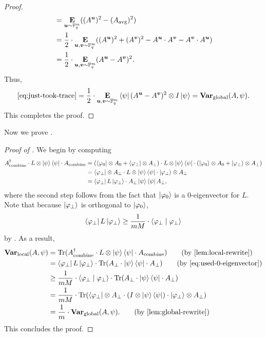 \begin{proof}
\begin{align*}
&= \mathop{\bf E\/}_{\boldsymbol{u} \sim \mathbb F_q^m}((A^{\boldsymbol{u}})^2 - (A_{\mathrm{avg}})^2)\\
&= \frac{1}{2}\cdot\mathop{\bf E\/}_{\boldsymbol{u}, \boldsymbol{v} \sim \mathbb F_q^m}((A^{\boldsymbol{u}})^2 + (A^{\boldsymbol{v}})^2 - A^{\boldsymbol{u}} \cdot A^{\boldsymbol{v}} - A^{\boldsymbol{v}} \cdot A^{\boldsymbol{u}})\\
&= \frac{1}{2}\cdot\mathop{\bf E\/}_{\boldsymbol{u}, \boldsymbol{v} \sim \mathbb F_q^m}(A^{\boldsymbol{u}} - A^{\boldsymbol{v}})^2.
\end{align*}
Thus,
\begin{equation*}
\eqref{eq:just-took-trace}
= \frac{1}{2} \cdot\mathop{\bf E\/}_{\boldsymbol{u}, \boldsymbol{v} \sim \mathbb F_q^m} \bra{\psi} (A^{\boldsymbol{u}} - A^{\boldsymbol{v}})^2 \otimes I \ket{\psi}
= \mathbf{Var}_{\mathrm{global}}(A, \psi).
\end{equation*}
This completes the proof.
\end{proof}

Now we prove .

\begin{proof}[Proof of ]
We begin by computing
\begin{align}
A_{\mathrm{combine}}^\dagger \cdot L \otimes \ket{\psi}\bra{\psi} \cdot A_{\mathrm{combine}}
 &=(\bra{\varphi_0} \otimes A_0 + \bra{\varphi_{\perp}} \otimes A_{\perp}) \cdot L \otimes \ket{\psi}\bra{\psi} \cdot (\ket{\varphi_0} \otimes A_0 + \ket{\varphi_{\perp}} \otimes A_{\perp})\nonumber\\
  &=\bra{\varphi_{\perp}} \otimes A_{\perp} \cdot L \otimes \ket{\psi}\bra{\psi} \cdot \ket{\varphi_{\perp}} \otimes A_{\perp} \nonumber\\
  & = \bra{\varphi_{\perp}} L \ket{\varphi_{\perp}} \cdot A_{\perp}  \ket{\psi}\bra{\psi}  A_{\perp} ,\label{eq:used-0-eigenvector}
\end{align}
where the second step follows from the fact that $\ket{\varphi_{0}}$ is a $0$-eigenvector for $L$.
Note that because $\ket{\varphi_{\perp}}$ is orthogonal to $\ket{\varphi_0}$,
\begin{equation*}
\bra{\varphi_{\perp}} L \ket{\varphi_{\perp}} \geq \frac{1}{mM} \cdot \braket{\varphi_{\perp} \mid \varphi_{\perp}}
\end{equation*}
by .
As a result,
\begin{align*}
 \mathbf{Var}_{\mathrm{local}}(A,\psi) 
 & = \mathrm{Tr}(A_{\mathrm{combine}}^\dagger \cdot L \otimes \ket{\psi}\bra{\psi} \cdot A_{\mathrm{combine}}) \tag{by \Cref{lem:local-rewrite}}\\
  & = \bra{\varphi_{\perp}} L \ket{\varphi_{\perp}} \cdot \mathrm{Tr}(A_{\perp} \cdot  \ket{\psi}\bra{\psi} \cdot  A_{\perp}) \tag{by \Cref{eq:used-0-eigenvector}}\\
  & \geq \frac{1}{mM} \cdot \braket{\varphi_{\perp} \mid \varphi_{\perp}} \cdot \mathrm{Tr}(A_{\perp} \cdot  \ket{\psi}\bra{\psi} \cdot  A_{\perp})\\
    & = \frac{1}{mM} \cdot \mathrm{Tr}(\bra{\varphi_{\perp}} \otimes A_{\perp} \cdot (I \otimes \ket{\psi}\bra{\psi}) \cdot \ket{\varphi_{\perp}} \otimes A_{\perp})\\
    &=  \frac{1}{m} \cdot \mathbf{Var}_{\mathrm{global}}(A,\psi) . \tag{by \Cref{lem:global-rewrite}}
\end{align*}
This concludes the proof.
\end{proof}

